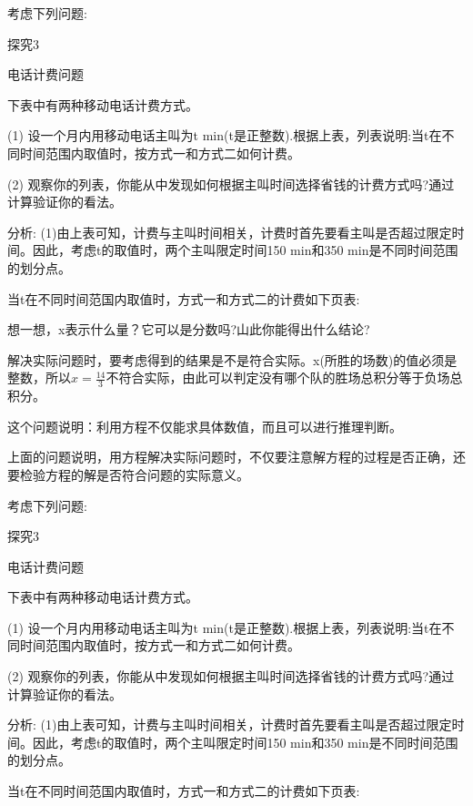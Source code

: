 \documentclass{article}
\begin{document}
\begin{example}
考虑下列问题:

探究3

电话计费问题

下表中有两种移动电话计费方式。

(1) 设一个月内用移动电话主叫为t min(t是正整数).根据上表，列表说明:当t在不同时间范围内取值时，按方式一和方式二如何计费。

(2) 观察你的列表，你能从中发现如何根据主叫时间选择省钱的计费方式吗?通过计算验证你的看法。

分析: (1)由上表可知，计费与主叫时间相关，计费时首先要看主叫是否超过限定时间。因此，考虑t的取值时，两个主叫限定时间150 min和350 min是不同时间范围的划分点。

当t在不同时间范国内取值时，方式一和方式二的计费如下页表:

想一想，x表示什么量？它可以是分数吗?山此你能得出什么结论?

解决实际问题时，要考虑得到的结果是不是符合实际。x(所胜的场数)的值必须是整数，所以$x=\frac{14}{3}$不符合实际，由此可以判定没有哪个队的胜场总积分等于负场总积分。

这个问题说明：利用方程不仅能求具体数值，而且可以进行推理判断。

上面的问题说明，用方程解决实际问题时，不仅要注意解方程的过程是否正确，还要检验方程的解是否符合问题的实际意义。

考虑下列问题:

探究3

电话计费问题

下表中有两种移动电话计费方式。

(1) 设一个月内用移动电话主叫为t min(t是正整数).根据上表，列表说明:当t在不同时间范围内取值时，按方式一和方式二如何计费。

(2) 观察你的列表，你能从中发现如何根据主叫时间选择省钱的计费方式吗?通过计算验证你的看法。

分析: (1)由上表可知，计费与主叫时间相关，计费时首先要看主叫是否超过限定时间。因此，考虑t的取值时，两个主叫限定时间150 min和350 min是不同时间范围的划分点。

当t在不同时间范国内取值时，方式一和方式二的计费如下页表:
\end{example}
\end{document}
